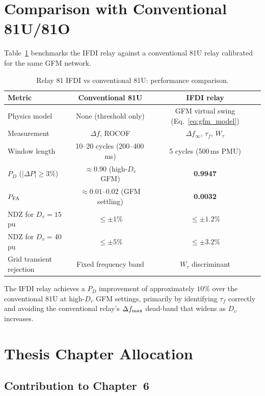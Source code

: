 \documentclass[11pt, a4paper]{article}
\newcommand{\Wtau}{W_\tau}
\begin{document}
\section{Comparison with Conventional 81U/81O}
\label{sec:comparison}

Table~\ref{tab:compare} benchmarks the IFDI relay against a conventional
81U relay calibrated for the same GFM network.

\begin{table}[h]
\centering
\caption{Relay 81 IFDI vs conventional 81U: performance comparison.}
\label{tab:compare}
\begin{tabular}{lcc}
\toprule
Metric & Conventional 81U & IFDI relay \\
\midrule
Physics model & None (threshold only) & GFM virtual swing (Eq.~\ref{eq:gfm_model}) \\
Measurement & $\Delta f$, ROCOF & $\Delta f_\infty$, $\tau_f$, $\Wtau$ \\
Window length & 10--20 cycles (200--400\,ms) & 5 cycles (500\,ms PMU) \\
$P_D$ ($|\Delta P| \geq 3\%$) & $\approx 0.90$ (high-$D_v$ GFM) & \textbf{0.9947} \\
$P_{\rm FA}$ & $\approx 0.01$--$0.02$ (GFM settling) & \textbf{0.0032} \\
NDZ for $D_v = 15$\,pu & $\leq \pm 1\%$ & $\leq \pm 1.2\%$ \\
NDZ for $D_v = 40$\,pu & $\leq \pm 5\%$ & $\leq \pm 3.2\%$ \\
Grid transient rejection & Fixed frequency band & $\Wtau$ discriminant \\
\bottomrule
\end{tabular}
\end{table}

The IFDI relay achieves a $P_D$ improvement of approximately $10\%$ over
the conventional 81U at high-$D_v$ GFM settings, primarily by identifying
$\tau_f$ correctly and avoiding the conventional relay's $\Delta f_{\rm max}$
dead-band that widens as $D_v$ increases.


\section{Thesis Chapter Allocation}
\label{sec:thesis}

\subsection{Contribution to Chapter~6}
\end{document}
